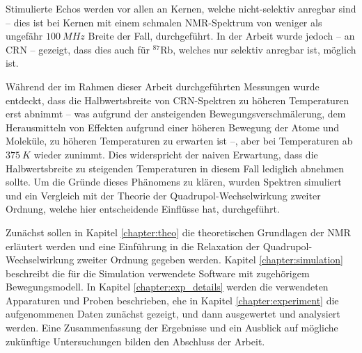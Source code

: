 Stimulierte Echos werden vor allen an Kernen, welche nicht-selektiv anregbar sind -- dies ist bei Kernen mit einem schmalen NMR-Spektrum von weniger als ungefähr $\SI{100}{MHz}$ Breite der Fall, durchgeführt. In der Arbeit \cite{joachim_master} wurde jedoch -- an CRN -- gezeigt, dass dies auch für $^\text{87}$Rb, welches nur selektiv anregbar ist, möglich ist.

Während der im Rahmen dieser Arbeit durchgeführten Messungen wurde entdeckt, dass die Halbwertsbreite von CRN-Spektren zu höheren Temperaturen erst abnimmt -- was aufgrund der ansteigenden Bewegungsverschmälerung, dem Herausmitteln von Effekten aufgrund einer höheren Bewegung der Atome und Moleküle, zu höheren Temperaturen zu erwarten ist --, aber bei Temperaturen ab $\SI{375}{K}$ wieder zunimmt. Dies widerspricht der naiven Erwartung, dass die Halbwertsbreite zu steigenden Temperaturen in diesem Fall lediglich abnehmen sollte. Um die Gründe dieses Phänomens zu klären, wurden Spektren simuliert und ein Vergleich mit der Theorie der Quadrupol-Wechselwirkung zweiter Ordnung, welche hier entscheidende Einflüsse hat, durchgeführt.

Zunächst sollen in Kapitel \ref{chapter:theo} die theoretischen Grundlagen der NMR erläutert werden und eine Einführung in die Relaxation der Quadrupol-Wechselwirkung zweiter Ordnung gegeben werden. Kapitel \ref{chapter:simulation} beschreibt die für die Simulation verwendete Software mit zugehörigem Bewegungsmodell. In Kapitel \ref{chapter:exp_details} werden die verwendeten Apparaturen und Proben beschrieben, ehe in Kapitel \ref{chapter:experiment} die aufgenommenen Daten zunächst gezeigt, und dann ausgewertet und analysiert werden. Eine Zusammenfassung der Ergebnisse und ein Ausblick auf mögliche zukünftige Untersuchungen bilden den Abschluss der Arbeit.

